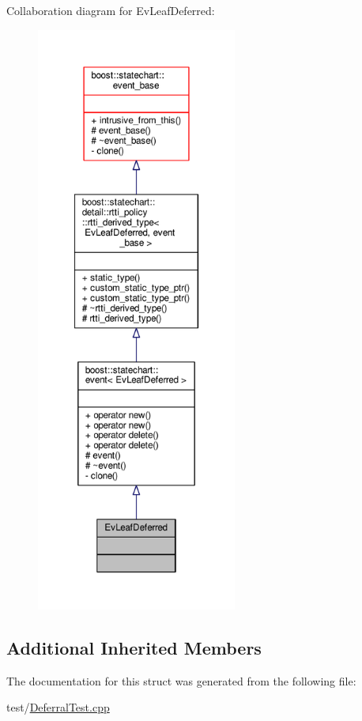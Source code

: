 Collaboration diagram for Ev\+Leaf\+Deferred\+:
\nopagebreak
\begin{figure}[H]
\begin{center}
\leavevmode
\includegraphics[height=550pt]{struct_ev_leaf_deferred__coll__graph}
\end{center}
\end{figure}
\subsection*{Additional Inherited Members}


The documentation for this struct was generated from the following file\+:\begin{DoxyCompactItemize}
\item 
test/\mbox{\hyperlink{_deferral_test_8cpp}{Deferral\+Test.\+cpp}}\end{DoxyCompactItemize}
